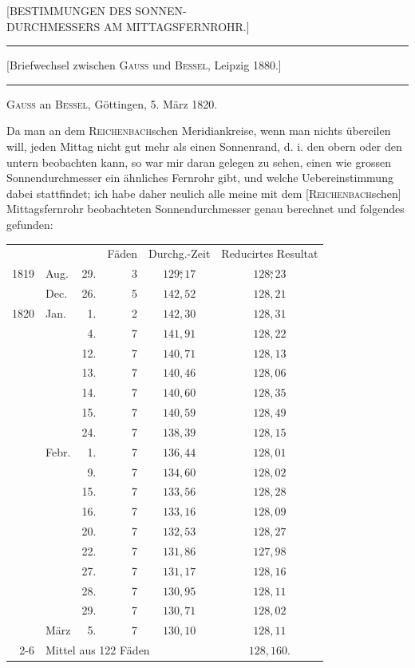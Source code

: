 \clearpage\begingroup
{}\NoSourceHead{}
\begin{center}
{\large [BESTIMMUNGEN DES SONNEN-\\DURCHMESSERS AM MITTAGSFERNROHR.]}\par\medskip
{}\par\medskip
\rule{.64\textwidth}{.3pt}\par
{\small [Briefwechsel zwischen \textsc{Gauss} und \textsc{Bessel}, Leipzig 1880.]}\par
\rule{.64\textwidth}{.3pt}\par\medskip
\textsc{Gauss} an \textsc{Bessel}, Göttingen, 5. März 1820.
\end{center}

\noindent\hspace*{\parindent}Da man an dem \textsc{Reichenbach}schen Meridiankreise, wenn man nichts übereilen will, jeden Mittag nicht gut mehr als einen Sonnenrand, d. i. den obern oder den untern beobachten kann, so war mir daran gelegen zu sehen, einen wie grossen Sonnendurchmesser ein ähnliches Fernrohr gibt, und welche Uebereinstimmung dabei stattfindet; ich habe daher neulich alle meine mit dem [\textsc{Reichenbach}schen] Mittagsfernrohr beobachteten Sonnendurchmesser genau berechnet und folgendes gefunden:
\begin{center}
\begin{tabular}{@{}rlrrcc@{}}
&&&Fäden&Durchg.-Zeit&Reducirtes Resultat\\
1819&Aug.&29.&3&\(129\overset{\mathrm{s}}{,}17\)&\(128\overset{\mathrm{s}}{,}23\)\\
&Dec.&26.&5&\(142{,}52\)&\(128{,}21\)\\
1820&Jan.&1.&2&\(142{,}30\)&\(128{,}31\)\\
&&4.&7&\(141{,}91\)&\(128{,}22\)\\
&&12.&7&\(140{,}71\)&\(128{,}13\)\\
&&13.&7&\(140{,}46\)&\(128{,}06\)\\
&&14.&7&\(140{,}60\)&\(128{,}35\)\\
&&15.&7&\(140{,}59\)&\(128{,}49\)\\
&&24.&7&\(138{,}39\)&\(128{,}15\)\\
&Febr.&1.&7&\(136{,}44\)&\(128{,}01\)\\
&&9.&7&\(134{,}60\)&\(128{,}02\)\\
&&15.&7&\(133{,}56\)&\(128{,}28\)\\
&&16.&7&\(133{,}16\)&\(128{,}09\)\\
&&20.&7&\(132{,}53\)&\(128{,}27\)\\
&&22.&7&\(131{,}86\)&\(127{,}98\)\\
&&27.&7&\(131{,}17\)&\(128{,}16\)\\
&&28.&7&\(130{,}95\)&\(128{,}11\)\\
&&29.&7&\(130{,}71\)&\(128{,}02\)\\
&März&5.&7&\(130{,}10\)&\(128{,}11\)\\\cline{2-6}
&\multicolumn{4}{l}{Mittel aus 122 Fäden}&\(128{,}160.\)
\end{tabular}
\end{center}
